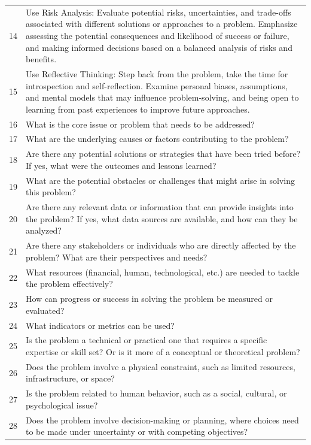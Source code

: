 \documentclass{article} %
\begin{document}
\begin{longtable}{p{1cm}p{10cm}}
14 & Use Risk Analysis: Evaluate potential risks, uncertainties, and trade-offs associated with different solutions or approaches to a problem. Emphasize assessing the potential consequences and likelihood of success or failure, and making informed decisions based on a balanced analysis of risks and benefits.\\
15 & Use Reflective Thinking: Step back from the problem, take the time for introspection and self-reflection. Examine personal biases, assumptions, and mental models that may influence problem-solving, and being open to learning from past experiences to improve future approaches.\\
16 & What is the core issue or problem that needs to be addressed?\\
17 & What are the underlying causes or factors contributing to the problem?\\
18 & Are there any potential solutions or strategies that have been tried before? If yes, what were the outcomes and lessons learned?\\
19 & What are the potential obstacles or challenges that might arise in solving this problem?\\
20 & Are there any relevant data or information that can provide insights into the problem? If yes, what data sources are available, and how can they be analyzed?\\
21 & Are there any stakeholders or individuals who are directly affected by the problem? What are their perspectives and needs?\\
22 & What resources (financial, human, technological, etc.) are needed to tackle the problem effectively?\\
23 & How can progress or success in solving the problem be measured or evaluated?\\
24 & What indicators or metrics can be used?\\
25 & Is the problem a technical or practical one that requires a specific expertise or skill set? Or is it more of a conceptual or theoretical problem?\\
26 & Does the problem involve a physical constraint, such as limited resources, infrastructure, or space?\\
27 & Is the problem related to human behavior, such as a social, cultural, or psychological issue?\\
28 & Does the problem involve decision-making or planning, where choices need to be made under uncertainty or with competing objectives?\\

\end{longtable}
\end{document}
